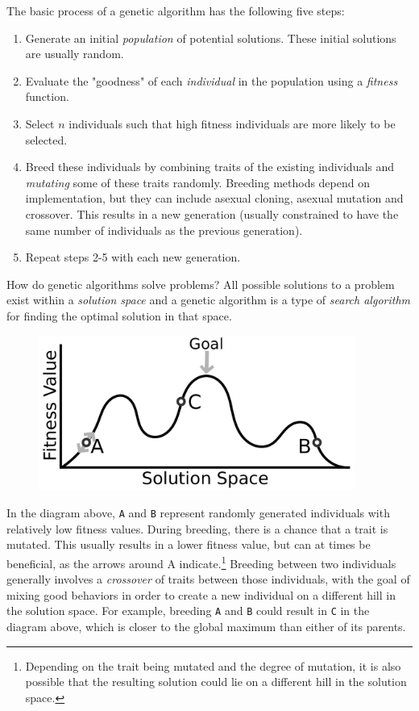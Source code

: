 \documentclass[12pt]{article}
\begin{document}
The basic process of a genetic algorithm has the following five steps:

\begin{enumerate}
\item Generate an initial \emph{population} of potential solutions. These initial solutions are usually random.

\item Evaluate the "goodness" of each \emph{individual} in the population using a \emph{fitness} function.

\item Select $n$ individuals such that high fitness individuals are more likely to be selected.

\item Breed these individuals by combining traits of the existing individuals and \emph{mutating} some of these traits randomly. Breeding methods depend on implementation, but they can include asexual cloning, asexual mutation and crossover. This results in a new generation (usually constrained to have the same number of individuals as the previous generation).

\item Repeat steps 2-5 with each new generation.
\end{enumerate}
How do genetic algorithms solve problems? All possible solutions to a problem exist within a \emph{solution space} and a genetic algorithm is a type of \emph{search algorithm} for finding the optimal solution in that space.

\begin{figure}[H]
\centerline{\includegraphics[height=2in]{figs/GeneticAlgStateSpace}}
\end{figure}

In the diagram above, \verb|A| and \verb|B| represent randomly generated individuals with relatively low fitness values. During breeding, there is a chance that a trait is mutated. This usually results in a lower fitness value, but can at times be beneficial, as the arrows around A indicate.\footnote{Depending on the trait being mutated and the degree of mutation, it is also possible that the resulting solution could lie on a different hill in the solution space.} Breeding between two individuals generally involves a \emph{crossover} of traits between those individuals, with the goal of mixing good behaviors in order to create a new individual on a different hill in the solution space. For example, breeding \verb|A| and \verb|B| could result in \verb|C| in the diagram above, which is closer to the global maximum than either of its parents.
 
\end{document}
